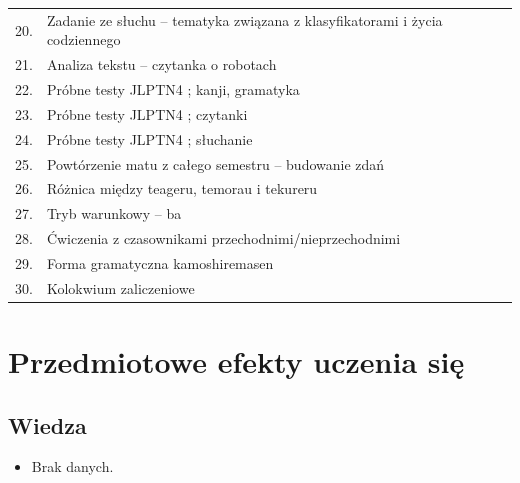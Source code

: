 \documentclass[12pt, a4paper]{article}
\begin{document}
{\begin{longtable}{m{1.5cm}m{14.5cm}}
  \rowcolor{tableRowAlt} 20. & Zadanie ze słuchu – tematyka związana z klasyfikatorami i życia codziennego \\
  \rowcolor{tableRowLight} 21. & Analiza tekstu – czytanka o robotach \\
  \rowcolor{tableRowAlt} 22. & Próbne testy JLPTN4 ; kanji, gramatyka \\
  \rowcolor{tableRowLight} 23. & Próbne testy JLPTN4 ; czytanki \\
  \rowcolor{tableRowAlt} 24. & Próbne testy JLPTN4 ; słuchanie \\
  \rowcolor{tableRowLight} 25. & Powtórzenie matu z całego semestru – budowanie zdań \\
  \rowcolor{tableRowAlt} 26. & Różnica między teageru, temorau i tekureru \\
  \rowcolor{tableRowLight} 27. & Tryb warunkowy – ba \\
  \rowcolor{tableRowAlt} 28. & Ćwiczenia z czasownikami przechodnimi/nieprzechodnimi \\
  \rowcolor{tableRowLight} 29. & Forma gramatyczna kamoshiremasen \\
  \rowcolor{tableRowAlt} 30. & Kolokwium zaliczeniowe \\
\bottomrule
\end{longtable}}

\section{Przedmiotowe efekty uczenia się}

\subsection*{Wiedza}
\begin{itemize}
  \item Brak danych.
\end{itemize}
\end{document}
